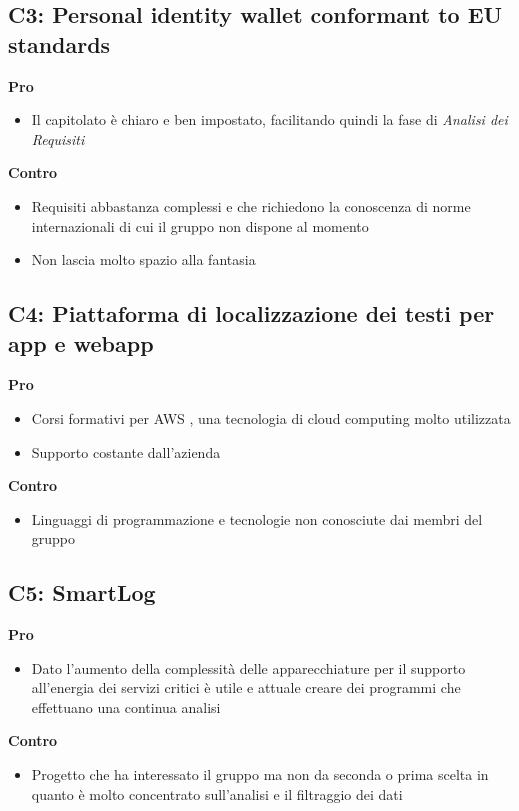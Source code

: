 \subsection{C3: Personal identity wallet conformant to EU standards}
\textbf{Pro}
\begin{itemize}[leftmargin=30pt, rightmargin=2cm]
    \item Il capitolato è chiaro e ben impostato, facilitando quindi la fase di \textit{Analisi dei Requisiti}
\end{itemize}
\textbf{Contro}
\begin{itemize}
    \item Requisiti abbastanza complessi e che richiedono la conoscenza di norme internazionali di cui il gruppo non dispone al momento
    \item Non lascia molto spazio alla fantasia
\end{itemize}

\subsection{C4: Piattaforma di localizzazione dei testi per app e webapp}
\textbf{Pro}
\begin{itemize}[leftmargin=30pt, rightmargin=2cm]
    \item Corsi formativi per AWS , una tecnologia di cloud computing molto utilizzata
    \item Supporto costante dall'azienda
\end{itemize}
\textbf{Contro}
\begin{itemize}
    \item Linguaggi di programmazione e tecnologie non conosciute dai membri del gruppo
\end{itemize}

\subsection{C5: SmartLog}
\textbf{Pro}
\begin{itemize}[leftmargin=30pt, rightmargin=2cm]
    \item Dato l’aumento della complessità delle apparecchiature per il supporto all’energia dei servizi critici è utile e attuale creare dei programmi che effettuano una continua analisi
\end{itemize}
\textbf{Contro}
\begin{itemize}
    \item Progetto che ha interessato il gruppo ma non da seconda o prima scelta in quanto è molto concentrato sull’analisi e il filtraggio dei dati
\end{itemize}

